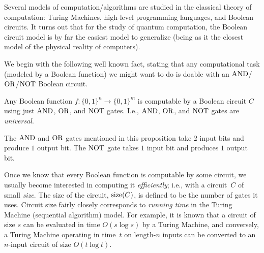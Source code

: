 \documentclass[12pt]{article}
\begin{document}
Several models of computation/algorithms are studied in the classical theory of computation: Turing Machines, high-level programming languages, and Boolean circuits.  It turns out that for the study of quantum computation, the Boolean circuit model is by far the easiest model to generalize (being as it the closest model of the physical reality of computers).

We begin with the following well known fact, stating that any computational task (modeled by a Boolean function) we might want to do is doable with an $\AND$/$\OR$/$\NOT$ Boolean circuit.
\begin{proposition}                                     \label{prop:universal1}
    Any Boolean function $f : \{0,1\}^n \to \{0,1\}^m$ is computable by a Boolean circuit $C$ using just $\AND$, $\OR$, and $\NOT$ gates. I.e., $\AND$, $\OR$, and $\NOT$ gates are \emph{universal}.
\end{proposition}
\begin{remark}
    The $\AND$ and $\OR$ gates mentioned in this proposition take $2$ input bits and produce $1$ output bit.  The $\NOT$ gate takes $1$ input bit and produces $1$ output bit.
\end{remark}
\begin{remark}
    Once we know that every Boolean function is computable by some circuit, we usually become interested in computing it \emph{efficiently}; i.e., with a circuit~$C$ of small \emph{size}.  The size of the circuit, $\size(C)$, is defined to be the number of gates it uses. Circuit size fairly closely corresponds to \emph{running time} in the Turing Machine (sequential algorithm) model.  For example, it is known that a circuit of size $s$ can be evaluated in time $O(s \log s)$ by a Turing Machine, and conversely, a Turing Machine operating in time~$t$ on length-$n$ inputs can be converted to an $n$-input circuit of size $O(t \log t)$.
\end{remark}
\end{document}
